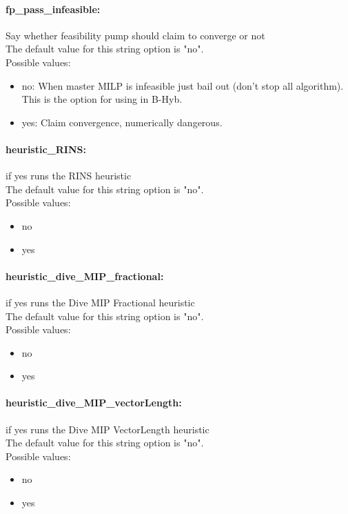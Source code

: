 \paragraph{fp\_pass\_infeasible:}\label{opt:fp_pass_infeasible} Say whether feasibility pump should claim to converge or not \\
 The default value for this string option is "no".
\\ 
Possible values:
\begin{itemize}
   \item no: When master MILP is infeasible just bail out (don't stop all algorithm). This is the option for using in B-Hyb.
   \item yes: Claim convergence, numerically dangerous.
\end{itemize}

\paragraph{heuristic\_RINS:}\label{opt:heuristic_RINS} if yes runs the RINS heuristic \\
 The default value for this string option is "no".
\\ 
Possible values:
\begin{itemize}
   \item no
   \item yes
\end{itemize}

\paragraph{heuristic\_dive\_MIP\_fractional:}\label{opt:heuristic_dive_MIP_fractional} if yes runs the Dive MIP Fractional heuristic \\
 The default value for this string option is "no".
\\ 
Possible values:
\begin{itemize}
   \item no
   \item yes
\end{itemize}

\paragraph{heuristic\_dive\_MIP\_vectorLength:}\label{opt:heuristic_dive_MIP_vectorLength} if yes runs the Dive MIP VectorLength heuristic \\
 The default value for this string option is "no".
\\ 
Possible values:
\begin{itemize}
   \item no
   \item yes
\end{itemize}

